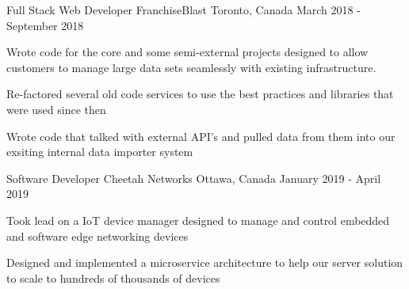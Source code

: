 

\begin{cventries}

  \cventry
    {Full Stack Web Developer} %
    {FranchiseBlast} %
    {Toronto, Canada} %
    {March 2018 - September 2018} %
    {
      \begin{cvitems} %
        \item {Wrote code for the core and some semi-external projects designed to allow customers to manage large data sets seamlessly with existing infrastructure.}
        \item {Re-factored several old code services to use the best practices and libraries that were used since then}
        \item {Wrote code that talked with external API's and pulled data from them into our exsiting internal data importer system}
      \end{cvitems}
    }

  \cventry
    {Software Developer} %
    {Cheetah Networks} %
    {Ottawa, Canada} %
    {January 2019 - April 2019} %
    {
      \begin{cvitems} %
        \item {Took lead on a IoT device manager designed to manage and control embedded and software edge networking devices}
        \item {Designed and implemented a microservice architecture to help our server solution to scale to hundreds of thousands of devices}
      \end{cvitems}
    }

\end{cventries}
